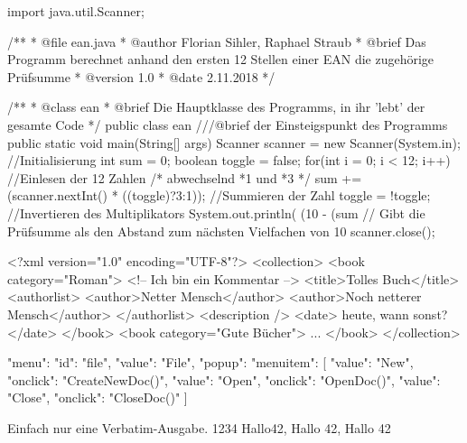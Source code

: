 \documentclass{sopra-base}
\begin{document}
\begin{java}
import java.util.Scanner;

/**
 *  @file ean.java
 *  @author Florian Sihler, Raphael Straub
 *  @brief Das Programm berechnet anhand den ersten 12 Stellen einer EAN die zugehörige Prüfsumme
 *  @version 1.0
 *  @date 2.11.2018
 */

/**
 * @class ean
 * @brief Die Hauptklasse des Programms, in ihr 'lebt' der gesamte Code
 */
public class ean {
    ///@brief der Einsteigspunkt des Programms
    public static void main(String[] args){
        Scanner scanner = new Scanner(System.in); //Initialisierung
        int sum = 0; boolean toggle = false;
        for(int i = 0; i < 12; i++){ //Einlesen der 12 Zahlen
                                         /* abwechselnd *1 und *3 */
            sum += (scanner.nextInt() * ((toggle)?3:1)); //Summieren der Zahl
            toggle = !toggle; //Invertieren des Multiplikators
        }
        System.out.println( (10 - (sum %
        // Gibt die Prüfsumme als den Abstand zum nächsten Vielfachen von 10
        scanner.close();
    }
}
\end{java}

\begin{xml*}[morekeywords={[3]{collection,book,title,authorlist,description,date,author}}]
<?xml version="1.0" encoding="UTF-8"?>
<collection>
    <book category="Roman">
        <!-- Ich bin ein Kommentar -->
        <title>Tolles Buch</title>
        <authorlist>
            <author>Netter Mensch</author>
            <author>Noch netterer Mensch</author>
        </authorlist>
        <description />
        <date> heute, wann sonst? </date>
    </book>
    <book category="Gute Bücher">
        ...
    </book>
</collection>
\end{xml*}

\begin{json}
{"menu": {
  "id": "file",
  "value": "File",
  "popup": {
    "menuitem": [
      {"value": "New", "onclick": "CreateNewDoc()"},
      {"value": "Open", "onclick": "OpenDoc()"},
      {"value": "Close", "onclick": "CloseDoc()"}
    ]
  }
}}
\end{json}

\begin{void}
Einfach nur eine Verbatim-Ausgabe. 1234 Hallo42, Hallo 42, Hallo 42
\end{void}
\end{document}
